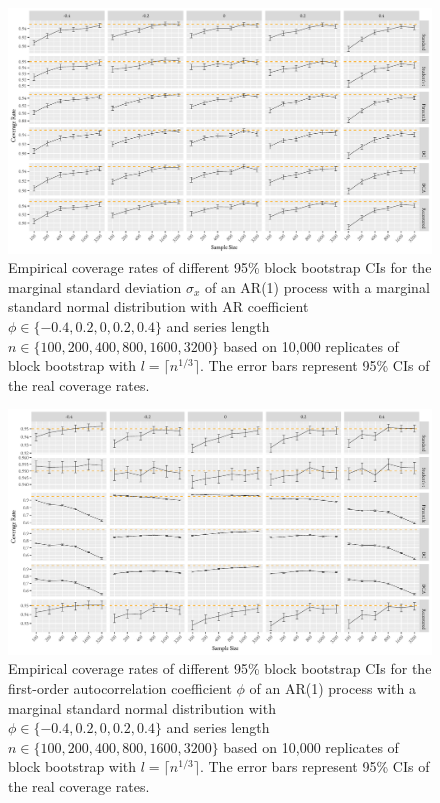 \documentclass[10pt]{article}
\begin{document}
\begin{figure}[bp]
  \centering
  \includegraphics[width=\textwidth]{figures/plot_norm_sigma_1}
  \caption{Empirical coverage rates of different 95\% block bootstrap CIs for
    the marginal standard deviation $\sigma_x$ of an AR(1) process with a
    marginal standard normal distribution with AR 
    coefficient $\phi \in \{-0.4, 0.2, 0, 0.2, 0.4\}$ and series length 
    $n \in \{100, 200, 400, 800, 1600, 3200\}$ based on 10,000 replicates of
    block bootstrap with $l = \lceil n^{1/3} \rceil$. The 
    error bars represent 95\% CIs of the real coverage rates.}
  \label{fig:sigma1}
\end{figure}


\begin{figure}[tbp]
  \centering
  \includegraphics[width=\textwidth]{figures/plot_norm_phi_1}
  \caption{Empirical coverage rates of different 95\% block bootstrap CIs for 
    the first-order autocorrelation coefficient $\phi$ of an AR(1) process with 
    a marginal standard normal distribution with 
    $\phi \in \{-0.4, 0.2, 0, 0.2, 0.4\}$ and series length
    $n \in \{100, 200, 400, 800, 1600, 3200\}$ based on 10,000 replicates of
    block bootstrap with $l = \lceil n^{1/3} \rceil$. The
    error bars represent 95\% CIs of the real coverage rates.}
  \label{fig:phi1}
\end{figure}
\end{document}
